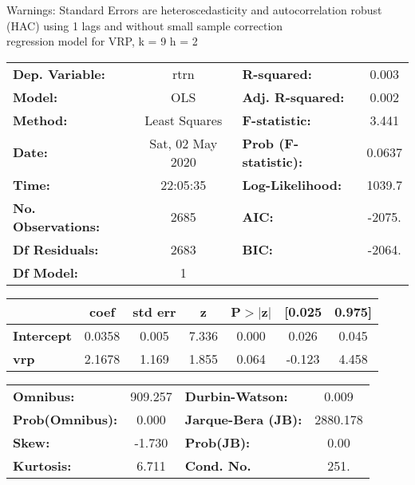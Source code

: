Warnings: \newline
 [1] Standard Errors are heteroscedasticity and autocorrelation robust (HAC) using 1 lags and without small sample correction\\ 

regression model for VRP, k = 9 h = 2\begin{center}
\begin{tabular}{lclc}
\toprule
\textbf{Dep. Variable:}    &       rtrn       & \textbf{  R-squared:         } &     0.003   \\
\textbf{Model:}            &       OLS        & \textbf{  Adj. R-squared:    } &     0.002   \\
\textbf{Method:}           &  Least Squares   & \textbf{  F-statistic:       } &     3.441   \\
\textbf{Date:}             & Sat, 02 May 2020 & \textbf{  Prob (F-statistic):} &   0.0637    \\
\textbf{Time:}             &     22:05:35     & \textbf{  Log-Likelihood:    } &    1039.7   \\
\textbf{No. Observations:} &        2685      & \textbf{  AIC:               } &    -2075.   \\
\textbf{Df Residuals:}     &        2683      & \textbf{  BIC:               } &    -2064.   \\
\textbf{Df Model:}         &           1      & \textbf{                     } &             \\
\bottomrule
\end{tabular}
\begin{tabular}{lcccccc}
                   & \textbf{coef} & \textbf{std err} & \textbf{z} & \textbf{P$> |$z$|$} & \textbf{[0.025} & \textbf{0.975]}  \\
\midrule
\textbf{Intercept} &       0.0358  &        0.005     &     7.336  &         0.000        &        0.026    &        0.045     \\
\textbf{vrp}       &       2.1678  &        1.169     &     1.855  &         0.064        &       -0.123    &        4.458     \\
\bottomrule
\end{tabular}
\begin{tabular}{lclc}
\textbf{Omnibus:}       & 909.257 & \textbf{  Durbin-Watson:     } &    0.009  \\
\textbf{Prob(Omnibus):} &   0.000 & \textbf{  Jarque-Bera (JB):  } & 2880.178  \\
\textbf{Skew:}          &  -1.730 & \textbf{  Prob(JB):          } &     0.00  \\
\textbf{Kurtosis:}      &   6.711 & \textbf{  Cond. No.          } &     251.  \\
\bottomrule
\end{tabular}
\end{center}

